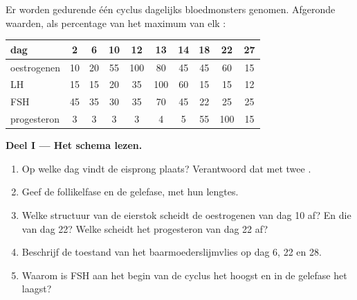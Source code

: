 \begin{problem}
\label{pb:g11:hormones-and-reproduction:1}
Er worden gedurende één cyclus dagelijks bloedmonsters genomen. Afgeronde
waarden, als percentage van het maximum van elk :

\begin{center}
\begin{tabular}{lccccccccc}
dag & 2 & 6 & 10 & 12 & 13 & 14 & 18 & 22 & 27 \\ \hline
oestrogenen & 10 & 20 & 55 & 100 & 80 & 45 & 45 & 60 & 15 \\
LH & 15 & 15 & 20 & 35 & 100 & 60 & 15 & 15 & 12 \\
FSH & 45 & 35 & 30 & 35 & 70 & 45 & 22 & 25 & 25 \\
progesteron & 3 & 3 & 3 & 3 & 4 & 5 & 55 & 100 & 15 \\
\end{tabular}
\end{center}

\medskip
\noindent\textbf{Deel I --- Het schema lezen.}
\begin{enumerate}
  \item Op welke dag vindt de eisprong plaats? Verantwoord dat met twee
        .
  \item Geef de follikelfase en de gelefase, met hun lengtes.
  \item Welke structuur van de eierstok scheidt de oestrogenen van dag 10
        af? En die van dag 22? Welke scheidt het progesteron van dag 22
        af?
  \item Beschrijf de toestand van het baarmoederslijmvlies op dag 6, 22
        en 28.
  \item Waarom is FSH aan het begin van de cyclus het hoogst en in de
        gelefase het laagst?
\end{enumerate}


\end{problem}
